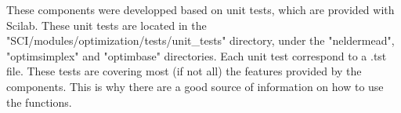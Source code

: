 These components were developped based on unit tests, which are 
provided with Scilab.
These unit tests are located in the "SCI/modules/optimization/tests/unit\_tests"
directory, under the "neldermead", "optimsimplex" and "optimbase" directories.
Each unit test correspond to a .tst file. These tests are covering most 
(if not all) the features provided by the components. This is why there are 
a good source of information on how to use the functions.




